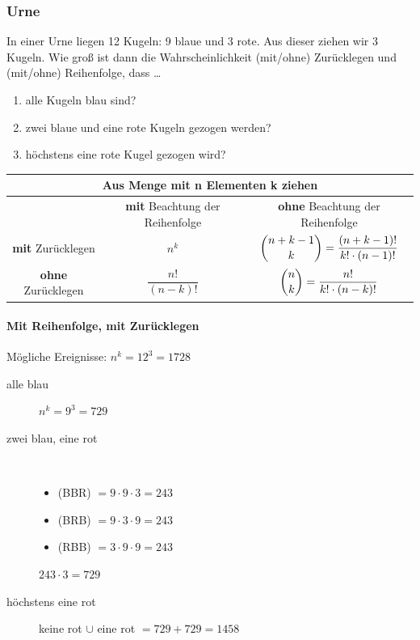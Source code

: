 \documentclass[11pt, a4paper]{article}
\begin{document}
\subsubsection{Urne}
In einer Urne liegen 12 Kugeln: 9 blaue und 3 rote. Aus dieser ziehen wir 3 Kugeln. Wie groß ist dann die Wahrscheinlichkeit (mit/ohne) Zurücklegen und (mit/ohne) Reihenfolge, dass \dots
\begin{enumerate}
	\item alle Kugeln blau sind?
	\item zwei blaue und eine rote Kugeln gezogen werden?
	\item höchstens eine rote Kugel gezogen wird?
\end{enumerate}
\begin{tabular}{|c||c|c|}
	\hline
	\multicolumn{3}{|c|}{Aus Menge mit \textbf{n} Elementen \textbf{k} ziehen} \\
	\hline
	 & \textbf{mit} Beachtung der Reihenfolge & \textbf{ohne} Beachtung der Reihenfolge \\
	\hline \hline
	\textbf{mit} Zurücklegen & $n^k$ & $\dbinom{n+k-1}{k} = \dfrac{(n+k-1)!}{k!\cdot (n-1)!}$ \\
	\hline
	\textbf{ohne} Zurücklegen & $\dfrac{n!}{(n-k)!}$ & $\dbinom{n}{k} = \dfrac{n!}{k!\cdot (n-k)!}$ \\
\hline
\end{tabular}

\paragraph{Mit Reihenfolge, mit Zurücklegen}
Mögliche Ereignisse: $n^k = 12^3 = 1728$
\begin{description}
	\item[alle blau] $n^k = 9^3 = 729$
	\item[zwei blau, eine rot] \ 
		\begin{itemize}
			\item (BBR) $= 9 \cdot 9 \cdot 3 = 243$
			\item (BRB) $= 9 \cdot 3 \cdot 9 = 243$
			\item (RBB) $= 3 \cdot 9 \cdot 9 = 243$
		\end{itemize}
		$243 \cdot 3 = 729$
	\item[höchstens eine rot] keine rot $\cup$ eine rot $= 729+729 = 1458$
\end{description}
\end{document}
